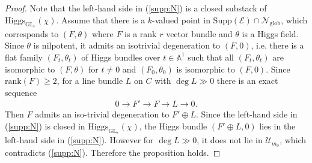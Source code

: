 \documentclass [11pt,oneside,a4paper,mathscr]{amsart}
\theoremstyle{definition}
\renewcommand{\geq}{\geqslant}
\newcommand{\GL}{\operatorname{GL}}
\newcommand{\Hig}{\mathrm{Higgs}}
\begin{document}
\begin{proof}
Note that the left-hand side in (\ref{supp:N}) is a closed substack
of $\Hig_{\GL_r}(\chi)$. 
Assume that there is a $k$-valued point in $\mathrm{Supp}(\mathcal{E}) \cap \mathcal{N}_{\mathrm{glob}}$, which corresponds to $(F, \theta)$ where $F$ is a rank $r$ vector bundle and $\theta$ is a Higgs field. 
Since $\theta$ is nilpotent, it admits an isotrivial degeneration to $(F, 0)$, 
i.e. there is a flat family $(F_t, \theta_t)$ of Higgs bundles over 
$t\in \mathbb{A}^1$ such that
all $(F_t, \theta_t)$ are isomorphic to $(F, \theta)$ for $t\neq 0$ 
and $(F_0, \theta_0)$ is isomorphic to $(F, 0)$. 
Since $\mathrm{rank}(F) \geq 2$, 
for a line bundle $L$ on $C$ with $\deg L\gg 0$
there is an exact sequence 
\begin{align*}
    0 \to F' \to F \to L \to 0. 
\end{align*}
Then $F$ admits an iso-trivial degeneration to $F'\oplus L$. 
Since the left-hand side in (\ref{supp:N}) is closed in $\Hig_{\GL_r}(\chi)$, 
the Higgs bundle $(F'\oplus L, 0)$ lies in the 
left-hand side in (\ref{supp:N}). However for $\deg L \gg 0$, 
it does not lie in $\mathcal{U}_{m_0}$, which contradicts (\ref{supp:N}). 
Therefore the proposition holds. 
\end{proof}
\end{document}
